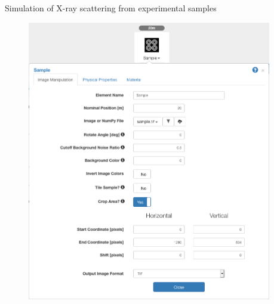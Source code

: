 \documentclass[final]{beamer}
\newlength{\sepwid}
\newlength{\onecolwid}
\begin{document}
\begin{frame}[t]
\begin{columns}[t]
\begin{column}{\sepwid}\end{column} %
\begin{column}{\onecolwid} %


\begin{block}{\faSpinner{} Simulation of X-ray scattering from experimental samples}

\begin{figure}
\includegraphics[width=0.9\linewidth]{images/sample_menu.png}
\end{figure}


\end{block}
\end{column}
\end{columns}
\end{frame}
\end{document}
